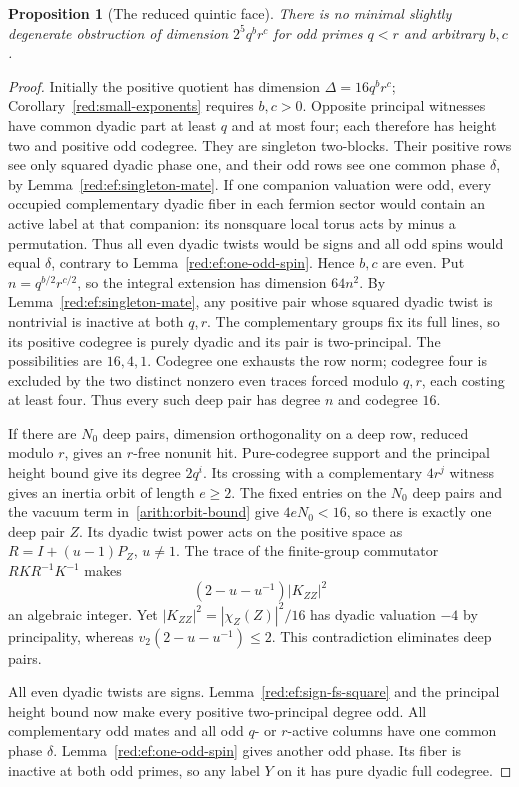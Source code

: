 \documentclass[11pt,a4paper]{article}
\numberwithin{equation}{section}
\newtheorem{proposition}[theorem]{Proposition}
\begin{document}
\begin{proposition}[The reduced quintic face]
\label{red:ef:reduced-five}
There is no minimal slightly degenerate obstruction of dimension
$2^5q^br^c$ for odd primes $q<r$ and arbitrary $b,c$.
\end{proposition}
\begin{proof}
Initially the positive quotient has dimension $\Delta=16q^br^c$;
Corollary~\ref{red:small-exponents} requires $b,c>0$.
Opposite principal witnesses have common dyadic part at least
$q$ and at most four; each therefore has height two and
positive odd codegree. They are singleton two-blocks.
Their positive rows see only squared dyadic phase one, and
their odd rows see one common phase $\delta$, by
Lemma~\ref{red:ef:singleton-mate}. If one companion valuation were
odd, every occupied complementary dyadic fiber in each fermion
sector would contain an active label at that companion: its
nonsquare local torus acts by minus a permutation. Thus all even
dyadic twists would be signs and all odd spins would equal
$\delta$, contrary to Lemma~\ref{red:ef:one-odd-spin}. Hence $b,c$
are even. Put $n=q^{b/2}r^{c/2}$, so the integral extension has
dimension $64n^2$.
By Lemma~\ref{red:ef:singleton-mate}, any positive pair whose
squared dyadic twist is nontrivial is inactive at both $q,r$.
The complementary groups fix its full lines, so its positive
codegree is purely dyadic and its pair is two-principal.
The possibilities are $16,4,1$. Codegree one exhausts the row
norm; codegree four is excluded by the two distinct nonzero
even traces forced modulo $q,r$, each costing at least four.
Thus every such deep pair has degree $n$ and codegree $16$.

If there are $N_0$ deep pairs, dimension orthogonality on a
deep row, reduced modulo $r$, gives an $r$-free nonunit hit.
Pure-codegree support and the principal height bound give its
degree $2q^i$. Its crossing
with a complementary $4r^j$ witness gives an inertia orbit of
length $e\ge2$. The fixed entries on the $N_0$ deep pairs and the vacuum term in~\eqref{arith:orbit-bound} give $4eN_0<16$, so there is
exactly one deep pair $Z$. Its dyadic twist power acts on the
positive space as $R=I+(u-1)P_Z$, $u\ne1$. The trace of the
finite-group commutator $RKR^{-1}K^{-1}$ makes
\[
                    (2-u-u^{-1})|K_{ZZ}|^2
\]
an algebraic integer. Yet $|K_{ZZ}|^2=|\chi_Z(Z)|^2/16$
has dyadic valuation $-4$ by principality, whereas
$v_2(2-u-u^{-1})\le2$. This contradiction eliminates deep pairs.

All even dyadic twists are signs. Lemma~\ref{red:ef:sign-fs-square}
and the principal height bound now make every positive
two-principal degree odd. All complementary odd mates and all
odd $q$- or $r$-active columns have one common phase $\delta$.
Lemma~\ref{red:ef:one-odd-spin} gives another odd phase. Its fiber
is inactive at both odd primes, so any label $Y$ on it has
pure dyadic full codegree.


\end{proof}
\end{document}
